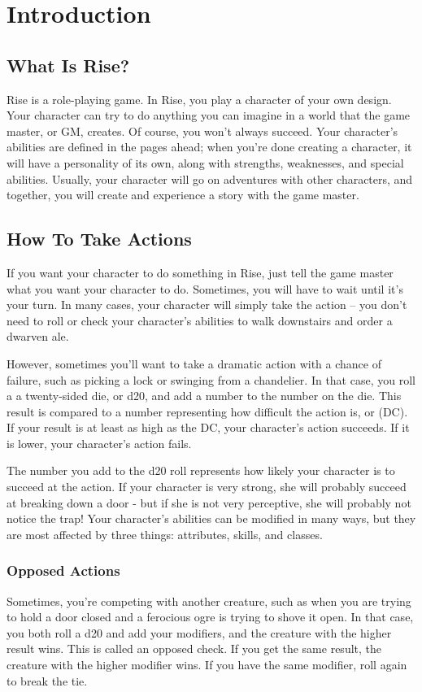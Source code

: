 \chapter{Introduction}

\section{What Is Rise?}
Rise is a role-playing game.
In Rise, you play a character of your own design.
Your character can try to do anything you can imagine in a world that the game master, or GM, creates.
Of course, you won't always succeed.
Your character's abilities are defined in the pages ahead; when you're done creating a character, it will have a personality of its own, along with strengths, weaknesses, and special abilities.
Usually, your character will go on adventures with other characters, and together, you will create and experience a story with the game master.

\section{How To Take Actions}

If you want your character to do something in Rise, just tell the game master what you want your character to do.
Sometimes, you will have to wait until it's your turn.
In many cases, your character will simply take the action -- you don't need to roll or check your character's abilities to walk downstairs and order a dwarven ale.

However, sometimes you'll want to take a dramatic action with a chance of failure, such as picking a lock or swinging from a chandelier.
In that case, you roll a a twenty-sided die, or d20, and add a number to the number on the die.
This result is compared to a number representing how difficult the action is, or  (DC).
If your result is at least as high as the DC, your character's action succeeds.
If it is lower, your character's action fails.

The number you add to the d20 roll represents how likely your character is to succeed at the action.
If your character is very strong, she will probably succeed at breaking down a door - but if she is not very perceptive, she will probably not notice the trap! Your character's abilities can be modified in many ways, but they are most affected by three things: attributes, skills, and classes.

\subsection{Opposed Actions}
Sometimes, you're competing with another creature, such as when you are trying to hold a door closed and a ferocious ogre is trying to shove it open.
In that case, you both roll a d20 and add your modifiers, and the creature with the higher result wins.
This is called an opposed check.
If you get the same result, the creature with the higher modifier wins.
If you have the same modifier, roll again to break the tie.

